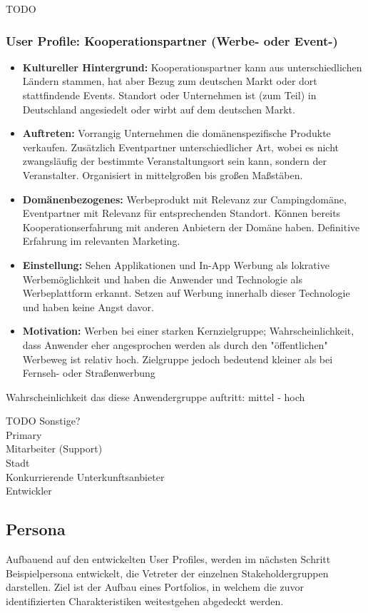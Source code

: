 \newpage
TODO
\subsubsection{User Profile: Kooperationspartner (Werbe- oder Event-)}
\begin{itemize}
   \item 
   \textbf{Kultureller Hintergrund:} Kooperationspartner kann aus unterschiedlichen Ländern stammen, hat aber Bezug zum deutschen Markt oder dort stattfindende Events. Standort oder Unternehmen ist (zum Teil) in Deutschland angesiedelt oder wirbt auf dem deutschen Markt.

   \item
   \textbf{Auftreten:} Vorrangig Unternehmen die domänenspezifische Produkte verkaufen. Zusätzlich Eventpartner unterschiedlicher Art, wobei es nicht zwangsläufig der bestimmte Veranstaltungsort sein kann, sondern der Veranstalter. Organisiert in mittelgroßen bis großen Maßstäben.

   \item 
   \textbf{Domänenbezogenes:} Werbeprodukt mit Relevanz zur Campingdomäne, Eventpartner mit Relevanz für entsprechenden Standort. Können bereits Kooperationserfahrung mit anderen Anbietern der Domäne haben. Definitive Erfahrung im relevanten Marketing.

   \item
   \textbf{Einstellung:} Sehen Applikationen und In-App Werbung als lokrative Werbemöglichkeit und haben die Anwender und Technologie als Werbeplattform erkannt. Setzen auf Werbung innerhalb dieser Technologie und haben keine Angst davor.

   \item
   \textbf{Motivation:} Werben bei einer starken Kernzielgruppe; Wahrscheinlichkeit, dass Anwender eher angesprochen werden als durch den "öffentlichen" Werbeweg ist relativ hoch. Zielgruppe jedoch bedeutend kleiner als bei Fernseh- oder Straßenwerbung
   
\end{itemize}
Wahrscheinlichkeit das diese Anwendergruppe auftritt: mittel - hoch

TODO Sonstige?\\
Primary\\
Mitarbeiter (Support)\\
Stadt\\
Konkurrierende Unterkunftsanbieter\\
Entwickler


\newpage
\subsection{Persona}
Aufbauend auf den entwickelten User Profiles, werden im nächsten Schritt Beispielpersona entwickelt, die Vetreter der einzelnen Stakeholdergruppen darstellen. Ziel ist der Aufbau eines Portfolios, in welchem die zuvor identifizierten Charakteristiken weitestgehen abgedeckt werden.

